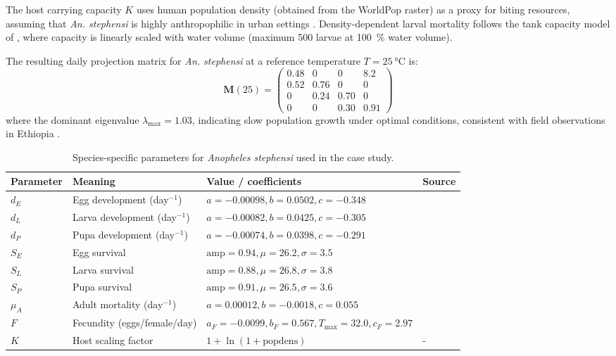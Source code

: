\documentclass{article}
\begin{document}
The host carrying capacity $K$ uses human population density (obtained from the WorldPop raster) as a proxy for biting resources, 
assuming that \textit{An. stephensi} is highly anthropophilic in urban settings \citep{2024.TA.SDA, 2022.AH.TPI}. Density-dependent 
larval mortality follows the tank capacity model of \citet{2016.ST.OTI}, where capacity is linearly scaled with water volume 
(maximum 500 larvae at \SI{100}{\percent} water volume).

The resulting daily projection matrix for \textit{An. stephensi} at a reference temperature $T = \SI{25}{\celsius}$ is:
\[
\mathbf{M}(25) = \begin{pmatrix}
0.48 & 0 & 0 & 8.2 \\
0.52 & 0.76 & 0 & 0 \\
0 & 0.24 & 0.70 & 0 \\
0 & 0 & 0.30 & 0.91
\end{pmatrix}
\]
where the dominant eigenvalue $\lambda_{\max} = 1.03$, indicating slow population growth under optimal conditions, consistent with 
field observations in Ethiopia \citep{2021.MB.AUO, 2022.AH.TPI}.

\begin{table}[!htb]
\centering
\small %
\caption{Species-specific parameters for \textit{Anopheles stephensi} used in the case study.}
\label{tab:stephensi_params}
\begin{tabular}{@{}llll@{}}
\toprule
Parameter & Meaning & Value / coefficients & Source \\ \midrule
$d_E$ & Egg development (day$^{-1}$) & $a=-0.00098, b=0.0502, c=-0.348$ & \citet{2022.OC.TIT} \\
$d_L$ & Larva development (day$^{-1}$) & $a=-0.00082, b=0.0425, c=-0.305$ & \citet{2023.JJ.BBA} \\
$d_P$ & Pupa development (day$^{-1}$) & $a=-0.00074, b=0.0398, c=-0.291$ & \citet{2022.OC.TIT} \\
$S_E$ & Egg survival & $\text{amp}=0.94, \mu=26.2, \sigma=3.5$ & \citet{2022.OC.TIT} \\
$S_L$ & Larva survival & $\text{amp}=0.88, \mu=26.8, \sigma=3.8$ & \citet{2022.OC.TIT} \\
$S_P$ & Pupa survival & $\text{amp}=0.91, \mu=26.5, \sigma=3.6$ & \citet{2022.OC.TIT} \\
$\mu_A$ & Adult mortality (day$^{-1}$) & $a=0.00012, b=-0.0018, c=0.055$ & \citet{2025.CG.EOT} \\
$F$ & Fecundity (eggs/female/day) & $a_F=-0.0099, b_F=0.567, T_{\max}=32.0, c_F=2.97$ & \citet{2023.JJ.BBA} \\
$K$ & Host scaling factor & $1 + \ln(1+\text{popdens})$ & - \\ \bottomrule %
\end{tabular}
\end{table}
\end{document}
